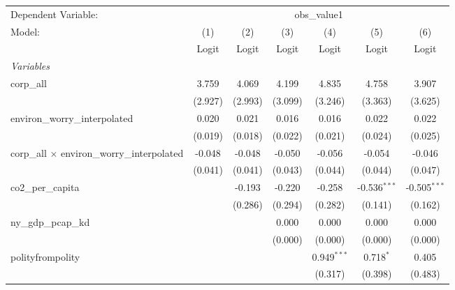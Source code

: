 
\begingroup
\centering
\begin{tabular}{lcccccc}
   \toprule
   Dependent Variable: & \multicolumn{6}{c}{obs\_value1}\\
   Model:                                              & (1)     & (2)     & (3)     & (4)           & (5)            & (6)\\  
                                                       &  Logit  & Logit   & Logit   & Logit         & Logit          & Logit\\  
   \midrule
   \emph{Variables}\\
   corp\_all                                           & 3.759   & 4.069   & 4.199   & 4.835         & 4.758          & 3.907\\   
                                                       & (2.927) & (2.993) & (3.099) & (3.246)       & (3.363)        & (3.625)\\   
   environ\_worry\_interpolated                        & 0.020   & 0.021   & 0.016   & 0.016         & 0.022          & 0.022\\   
                                                       & (0.019) & (0.018) & (0.022) & (0.021)       & (0.024)        & (0.025)\\   
   corp\_all $\times$ environ\_worry\_interpolated     & -0.048  & -0.048  & -0.050  & -0.056        & -0.054         & -0.046\\   
                                                       & (0.041) & (0.041) & (0.043) & (0.044)       & (0.044)        & (0.047)\\   
   co2\_per\_capita                                    &         & -0.193  & -0.220  & -0.258        & -0.536$^{***}$ & -0.505$^{***}$\\   
                                                       &         & (0.286) & (0.294) & (0.282)       & (0.141)        & (0.162)\\   
   ny\_gdp\_pcap\_kd                                   &         &         & 0.000   & 0.000         & 0.000          & 0.000\\   
                                                       &         &         & (0.000) & (0.000)       & (0.000)        & (0.000)\\   
   polityfrompolity                                    &         &         &         & 0.949$^{***}$ & 0.718$^{*}$    & 0.405\\   
                                                       &         &         &         & (0.317)       & (0.398)        & (0.483)\\   

\end{tabular}
